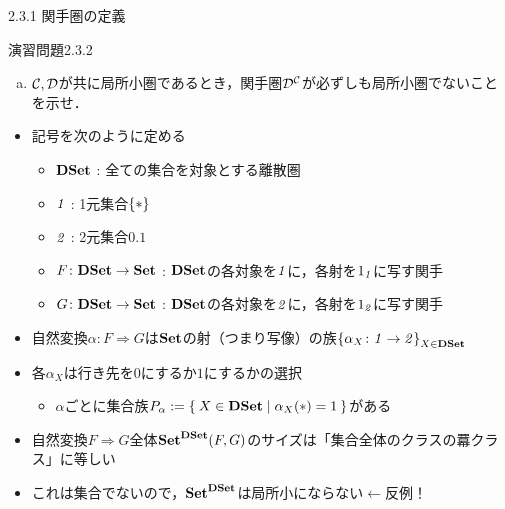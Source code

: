 \documentclass[uplatex,a4paper,dvipdfmx,aspectratio=169,10pt]{beamer}
\begin{document}
\begin{frame}[fragile]{2.3.1 関手圏の定義}
    \begin{exampleblock}{演習問題2.3.2}
        \begin{enumerate}[(c)]
            \item $\mathcal{C}, \mathcal{D}$が共に局所小圏であるとき，関手圏$\mathcal{D}^{\mathcal{C}}$が必ずしも局所小圏でないことを示せ．
        \end{enumerate}
    \end{exampleblock}
    \begin{itemize}
        \item 記号を次のように定める
            \begin{itemize}
                \item ${\mathbf{DSet}}$ : 全ての集合を対象とする離散圏
                \item ${\mathord{\mathit{1}}}$ : 1元集合$\qty{*}$
                \item ${\mathord{\mathit{2}}}$ : 2元集合$\qty{0, 1}$
                \item $F\colon {\mathbf{DSet}} \to {\mathbf{Set}}$ : ${\mathbf{DSet}}$の各対象を${\mathord{\mathit{1}}}$に，各射を$1_{\mathord{\mathit{1}}}$に写す関手
                \item $G\colon {\mathbf{DSet}} \to {\mathbf{Set}}$ : ${\mathbf{DSet}}$の各対象を${\mathord{\mathit{2}}}$に，各射を$1_{\mathord{\mathit{2}}}$に写す関手
            \end{itemize}
        \item 自然変換$\alpha\colon F \Rightarrow G$は${\mathbf{Set}}$の射（つまり写像）の族$\qty{\alpha_X \colon {\mathord{\mathit{1}}}\to {\mathord{\mathit{2}}}}_{X \in {\mathbf{DSet}}}$
        \item 各$\alpha_X$は行き先を$0$にするか$1$にするかの選択
            \begin{itemize}
                \item $\alpha$ごとに集合族$P_\alpha := \Set{ X \in {\mathbf{DSet}}| \alpha_X(*) = 1}$がある
            \end{itemize}
        \item 自然変換$F \Rightarrow G$全体${\mathbf{Set}}^{\mathbf{DSet}}(F, G)$のサイズは「集合全体のクラスの羃クラス」に等しい
        \item これは集合でないので，${\mathbf{Set}}^{\mathbf{DSet}}$は局所小にならない$\leftarrow$反例！
    \end{itemize}
\end{frame}
\end{document}
